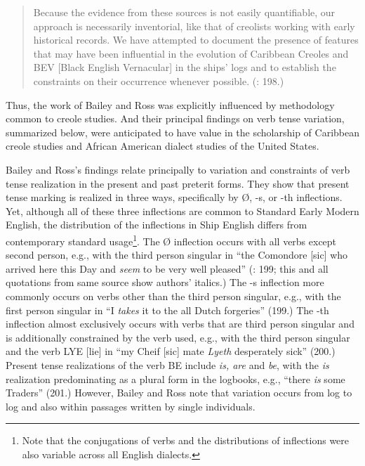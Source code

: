 \begin{quotation}
Because the evidence from these sources is not easily quantifiable, our approach is necessarily inventorial, like that of creolists working with early historical records. We have attempted to document the presence of features that may have been influential in the evolution of Caribbean Creoles and BEV [Black English Vernacular] in the ships’ logs and to establish the constraints on their occurrence whenever possible. (\citealt{BaileyRoss1988}: 198.) \end{quotation}

Thus, the work of Bailey and Ross was explicitly influenced by methodology common to creole studies. And their principal findings on verb tense variation, summarized below, were anticipated to have value in the scholarship of Caribbean creole studies and African American dialect studies of the United States.

Bailey and Ross’s findings relate principally to variation and constraints of verb tense realization in the present and past preterit forms. They show that present tense marking is realized in three ways, specifically by Ø, -s, or -th inflections. Yet, although all of these three inflections are common to Standard Early Modern English, the distribution of the inflections in Ship English differs from contemporary standard usage\footnote{Note that the conjugations of verbs and the distributions of inflections were also variable across all English dialects.}. The Ø inflection occurs with all verbs except second person, e.g., with the third person singular in “the Comondore [sic] who arrived here this Day and \textit{seem} to be very well pleased” (\citealt{BaileyRoss1988}: 199; this and all quotations from same source show authors’ italics.) The -s inflection more commonly occurs on verbs other than the third person singular, e.g., with the first person singular in “I \textit{takes} it to the all Dutch forgeries” (199.) The -th inflection almost exclusively occurs with verbs that are third person singular and is additionally constrained by the verb used, e.g., with the third person singular and the verb LYE [lie] in “my Cheif [sic] mate \textit{Lyeth} desperately sick” (200.) Present tense realizations of the verb BE include \textit{is, are} and \textit{be}, with the \textit{is} realization predominating as a plural form in the logbooks, e.g., “there \textit{is} some Traders” (201.) However, Bailey and Ross note that variation occurs from log to log and also within passages written by single individuals. 

